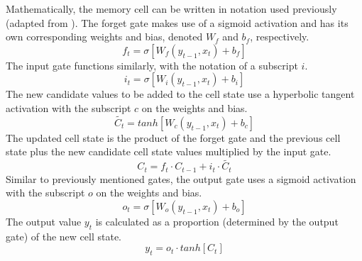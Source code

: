 Mathematically, the memory cell can be written in notation used previously (adapted from \cite{understandinglstm}). The forget gate makes use of a sigmoid activation and has its own corresponding weights and bias, denoted $W_f$ and $b_f$, respectively.
\begin{equation*}
    f_t = \sigma[W_f(y_{t-1}, x_t) + b_f] 
\end{equation*}
The input gate functions similarly, with the notation of a subscript $i$.
\begin{equation*}
    i_t = \sigma[W_i(y_{t-1}, x_t) + b_i] 
\end{equation*}
The new candidate values to be added to the cell state use a hyperbolic tangent activation with the subscript $c$ on the weights and bias.
\begin{equation*}
    \tilde{C_t} = tanh[W_c(y_{t-1}, x_t) + b_c]
\end{equation*}
The updated cell state is the product of the forget gate and the previous cell state plus the new candidate cell state values multiplied by the input gate.
\begin{equation*}
    C_t = f_t\cdot C_{t-1} + i_t\cdot \tilde{C_t}
\end{equation*}
Similar to previously mentioned gates, the output gate uses a sigmoid activation with the subscript $o$ on the weights and bias.
\begin{equation*}
    o_t = \sigma[W_o(y_{t-1}, x_t) + b_o]
\end{equation*}
The output value $y_t$ is calculated as a proportion (determined by the output gate) of the new cell state.
\begin{equation*}
    y_t = o_t\cdot tanh[C_t]
\end{equation*}
